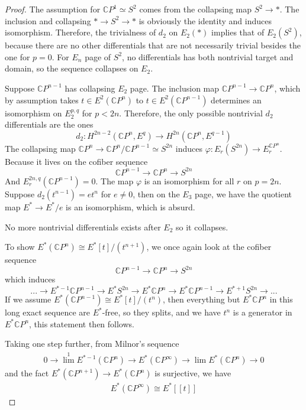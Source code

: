 \begin{proof}
    The assumption for $\mathbb{C}P^1\simeq S^2$ comes from the collapsing map $S^2\to *$. The inclusion and collapsing $*\to S^2\to *$ is obviously the identity and induces isomorphism. Therefore, the trivialness of $d_2$ on $E_2(*)$ implies that of $E_2(S^2)$, because there are no other differentials that are not necessarily trivial besides the one for $p=0$. For $E_n$ page of $S^2$, no differentials has both nontrivial target and domain, so the sequence collapses on $E_2$.

    Suppose $\mathbb{C}P^{n-1}$ has collapsing $E_2$ page. The inclusion map $\mathbb{C}P^{n-1}\to \mathbb{C}P^n$, which by assumption takes $t\in E^2(\mathbb{C}P^{n})$ to $t\in E^2(\mathbb{C}P^{n-1})$ determines an isomorphism on $E^{p,q}_2$ for $p<2n$. Therefore, the only possible nontrivial $d_2$ differentials are the ones 
    \[
    d_2:H^{2n-2}(\mathbb{C}P^n, E^q)\to H^{2n}(\mathbb{C}P^n, E^{q-1})
    \]
    The collapsing map $\mathbb{C}P^n\to \mathbb{C}P^n/\mathbb{C}P^{n-1}\simeq S^{2n}$ induces $\varphi: E_r(S^{2n})\to E_r^{\mathbb{C}P^n}$. Because it lives on the cofiber sequence 
    \[
    \mathbb{C}P^{n-1}\to \mathbb{C}P^n\to S^{2n}
    \]
    And $E_r^{2n,q}(\mathbb{C}P^{n-1})=0$. The map $\varphi$ is an isomorphism for all $r$ on $p=2n$. Suppose $d_2(t^{n-1})=et^n$ for $e\neq 0$, then on the $E_3$ page, we have the quotient map $E^*\to E^*/e$ is an isomorphism, which is absurd.

    No more nontrivial differentials exists after $E_2$ so it collapses.

    To show $E^*(\mathbb{C}P^n)\cong E^*[t]/(t^{n+1})$, we once again look at the cofiber sequence
    \[
    \mathbb{C}P^{n-1}\to \mathbb{C}P^n\to S^{2n}
    \]
    which induces 
    \[
        ...\to E^{*-1} \mathbb{C}P^{n-1}\to E^{*} S^{2n}\to E^*\mathbb{C}P^{n}\to E^{*}\mathbb{C}P^{n-1} \to E^{*+1} S^{2n}\to...
    \]
    If we assume $E^*(\mathbb{C}P^{n-1})\cong E^*[t]/(t^{n})$, then everything but $E^*\mathbb{C}P^{n}$ in this long exact sequence are $E^*$-free, so they splits, and we have $t^{n}$ is a generator in $E^*\mathbb{C}P^{n}$, this statement then follows.

    Taking one step further, from Milnor's sequence
\begin{align*}
    0\to {\lim}^1E^{*-1}(\mathbb{C}P^n)\to E^*(\mathbb{C}P^\infty)\to {\lim}E^*(\mathbb{C}P^n)\to 0
\end{align*} and the fact $E^{*}(\mathbb{C}P^{n+1})\to E^{*}(\mathbb{C}P^n)$ is surjective, we have 
\begin{align*}
    E^*(\mathbb{C}P^\infty)\cong E^*[[t]]
\end{align*}
\end{proof}


